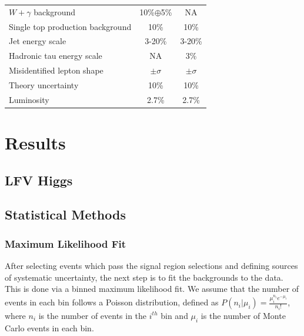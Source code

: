 \documentclass[oneside, letterpaper, oldfontcommands]{memoir}
\begin{document}
{{{\begin{table}[t]
{\begin{tabular}{l|c|c}
$W +\gamma$ background                               &              10\%$\oplus$5\%          &   NA    \\
Single top production background                       &               10\%         &   10\%   \\ \hline  \hline
Jet energy scale                                       &        3-20\%             &   3-20\% \\
Hadronic tau energy scale                              &        NA             &  3$\%$ \\
Misidentified lepton shape                             &        $\pm\sigma$              &  $\pm\sigma$  \\ \hline  \hline
Theory uncertainty                                     &              10\%          &    10\%  \\ \hline \hline
Luminosity                                             &              2.7\%          &    2.7\%  \\ \hline
  \end{tabular}
}
\end{table}




\chapter{Results}
\section{LFV Higgs}
\section{Statistical Methods}
\subsection{Maximum Likelihood Fit}
\qquad After selecting events which pass the signal region selections and defining sources of systematic uncertainty, the next step is to fit the backgrounds to the data. This is done via a binned maximum likelihood fit.\cite{BevingtonRobinson200207}\cite{Conway:2011in} We assume that the number of events in each bin follows a Poisson distribution, defined as $P(n_{i}|\mu_{i}) = \frac{\mu_{i}^{n_{i}}e^{-\mu_{i}}}{n_{i}!}$, where $n_{i}$ is the number of events in the $i^{th}$ bin and $\mu_{i}$ is the number of Monte Carlo events in each bin. 

}}}
\end{document}
